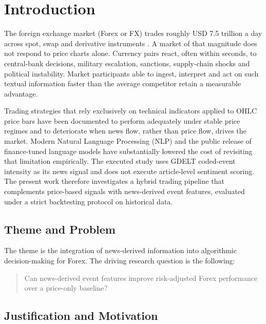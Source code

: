 \chapter{Introduction} \label{cap:introduction}

The foreign exchange market (Forex or FX) trades roughly USD 7.5 trillion a day across spot, swap and derivative instruments \cite{bis2022triennial}. A market of that magnitude does not respond to price charts alone. Currency pairs react, often within seconds, to central-bank decisions, military escalation, sanctions, supply-chain shocks and political instability. Market participants able to ingest, interpret and act on such textual information faster than the average competitor retain a measurable advantage.

Trading strategies that rely exclusively on technical indicators applied to OHLC price bars \cite{murphy1999technical} have been documented to perform adequately under stable price regimes and to deteriorate when news flow, rather than price flow, drives the market. Modern Natural Language Processing (NLP) and the public release of finance-tuned language models \cite{araci2019finbert,yang2020finbert,wu2023bloomberggpt,liu2023fingpt} have substantially lowered the cost of revisiting that limitation empirically. The executed study uses GDELT coded-event intensity as its news signal and does not execute article-level sentiment scoring. The present work therefore investigates a hybrid trading pipeline that complements price-based signals with news-derived event features, evaluated under a strict backtesting protocol on historical data.

\section{Theme and Problem} \label{sec:theme-problem}

The theme is the integration of news-derived information into algorithmic decision-making for Forex. The driving research question is the following:

\begin{quote}
Can news-derived event features improve risk-adjusted Forex performance over a price-only baseline?
\end{quote}

\section{Justification and Motivation} \label{sec:justification}

